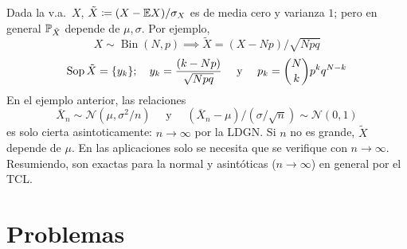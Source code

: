 \begin{observacion}[35]
Dada la v.a.\ $X$, $\tilde{X} \coloneqq (X - \mathbb{E} X)/\sigma_X$ es de media cero y varianza $1$; pero en general $\mathbb{P}_{\tilde{X}}$ depende de $\mu, \sigma$. Por ejemplo, 
$$X \sim \operatorname{Bin}(N,p) \implies \tilde{X} = (X - Np)/\sqrt{Npq}$$
$$\operatorname{Sop} \tilde X = \{y_k\}; \quad  y_k = \frac{(k - Np)}{\sqrt{Npq}} \quad \text{ y } \quad p_k = \binom{N}{k}p^k q^{N-k}$$
En el ejemplo anterior, las relaciones 
$$\overline{X}_n \sim \mathcal{N}(\mu, \sigma^2/n) \quad \text{ y } \quad (\overline{X}_n - \mu)/(\sigma/\sqrt{n}) \sim \mathcal{N}(0,1)$$ es solo cierta asintoticamente: $n \to \infty$ por la LDGN. Si $n$ no es grande, $\tilde X$ depende de $\mu$. En las
aplicaciones solo se necesita que se verifique con $n \to \infty$. Resumiendo, son exactas para la normal y asintóticas ($n \to \infty$) en general por el TCL.
\end{observacion}

\section{Problemas}

